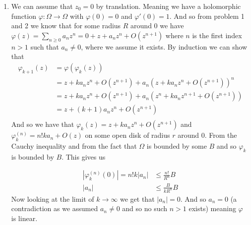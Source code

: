 \documentclass[12pt]{amsart}
\theoremstyle{definition}
\newcommand{\ra}{\rightarrow}
\let\phi\varphi
\begin{document}
\begin{enumerate}
\item We can assume that $z_0=0$ by translation. Meaning we have a holomorphic function $\phi:\Omega\ra\Omega$ with $\phi(0)=0$ and $\phi'(0)=1$. And so from problem 1 and 2 we know that for some radius $R$ around $0$ we have $\phi(z)=\sum_{n\geq 0}a_nz^n=0+z+a_nz^n+O(z^{n+1})$ where $n$ is the first index $n>1$ such that $a_n\neq0$, where we assume it exists. By induction we can show that 
\begin{align*}
    \phi_{k+1}(z)&=\phi(\phi_k(z))\\
    &=z+ka_nz^n+O(z^{n+1})+a_n(z+ka_nz^n+O(z^{n+1}))^n\\
    &=z+ka_nz^n+O(z^{n+1})+a_n(z^n+ka_nz^{n+1}+O(z^{n+1}))\\
    &=z+(k+1)a_nz^n+O(z^{n+1})\\
\end{align*} %
And so we have that $\phi_k(z)=z+ka_nz^n+O(z^{n+1})$ and $\phi^{(n)}_k=n!ka_n+O(z)$ on some open disk of radius $r$ around $0$. From the Cauchy inequality and from the fact that $\Omega$ is bounded by some $B$ and so $\phi_k$ is bounded by $B$. This gives us

\begin{align*}
    |\phi^{(n)}_k(0)|=n!k|a_n|&\leq \frac{n!}{R^n}B\\
    |a_n|&\leq\frac{B}{kR^n}B
\end{align*}
Now looking at the limit of $k\ra \infty$ we get that $|a_n|=0$. And so $a_n=0$ (a contradiction as we assumed $a_n\neq 0$ and so no such $n>1$ exists) meaning $\phi$ is linear.

\end{enumerate}
\end{document}
